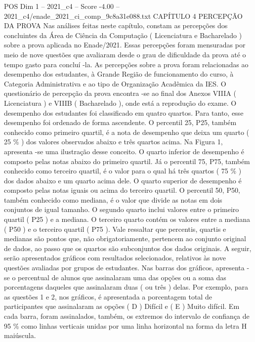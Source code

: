 \begin{textsample}{POS Dim 1 – 2021\_c4 – Score -4.00 – 2021\_c4/enade\_2021\_ci\_comp\_9c8a31e088.txt}  \label{ex:f1_pos_376}
CAPÍTULO 4 PERCEPÇÃO DA PROVA Nas análises feitas neste capítulo, constam as percepções dos concluintes da Área de Ciência da Computação ( Licenciatura e Bacharelado ) sobre a prova aplicada no Enade/2021.
Essas percepções foram mensuradas por meio de nove questões que avaliaram desde o grau de dificuldade da prova até o tempo gasto para concluí -la.
As percepções sobre a prova foram relacionadas ao desempenho dos estudantes, à Grande Região de funcionamento do curso, à Categoria Administrativa e ao tipo de Organização Acadêmica da IES.
O questionário de percepção da prova encontra -se ao final dos Anexos VIIIA ( Licenciatura ) e VIIIB ( Bacharelado ), onde está a reprodução do exame.
O desempenho dos estudantes foi classificado em quatro quartos.
Para tanto, esse desempenho foi ordenado de forma ascendente.
O percentil 25, P25, também conhecido como primeiro quartil, é a nota de desempenho que deixa um quarto ( 25 \% ) dos valores observados abaixo e três quartos acima.
Na Figura 1, apresenta -se uma ilustração desse conceito.
O quarto inferior de desempenho é composto pelas notas abaixo do primeiro quartil.
Já o percentil 75, P75, também conhecido como terceiro quartil, é o valor para o qual há três quartos ( 75 \% ) dos dados abaixo e um quarto acima dele.
O quarto superior de desempenho é composto pelas notas iguais ou acima do terceiro quartil.
O percentil 50, P50, também conhecido como mediana, é o valor que divide as notas em dois conjuntos de igual tamanho.
O segundo quarto inclui valores entre o primeiro quartil ( P25 ) e a mediana.
O terceiro quarto contém os valores entre a mediana ( P50 ) e o terceiro quartil ( P75 ).
Vale ressaltar que percentis, quartis e medianas são pontos que, não obrigatoriamente, pertencem ao conjunto original de dados, ao passo que os quartos são subconjuntos dos dados originais.
A seguir, serão apresentados gráficos com resultados selecionados, relativos às nove questões avaliadas por grupos de estudantes.
Nas barras dos gráficos, apresenta -se o percentual de alunos que assinalaram uma das opções ou a soma das porcentagens daqueles que assinalaram duas ( ou três ) delas.
Por exemplo, para as questões 1 e 2, nos gráficos, é apresentada a porcentagem total de participantes que assinalaram as opções ( D ) Difícil e ( E ) Muito difícil.
Em cada barra, foram assinalados, também, os extremos do intervalo de confiança de 95 \% como linhas verticais unidas por uma linha horizontal na forma da letra H maiúscula.

\end{textsample}
